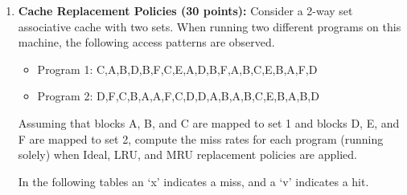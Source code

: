 \documentclass[a4paper, 11pt]{exam}
\begin{document}
\begin{enumerate}
\item \textbf {Cache Replacement Policies (30 points): }  Consider a 2-way set associative cache with two
sets. When running two different programs on this machine, the following access patterns are
observed. 

\begin{itemize}
\item Program 1: C,A,B,D,B,F,C,E,A,D,B,F,A,B,C,E,B,A,F,D
\item Program 2: D,F,C,B,A,A,F,C,D,D,A,B,A,B,C,E,B,A,B,D
\end{itemize}
Assuming that blocks A, B, and C are mapped to set 1 and blocks D, E, and F are mapped to
set 2, compute the miss rates for each program (running solely) when Ideal, LRU, and MRU
replacement policies are applied.

In the following tables an `x' indicates a miss, and a `v' indicates a hit.


\end{enumerate}
\end{document}
